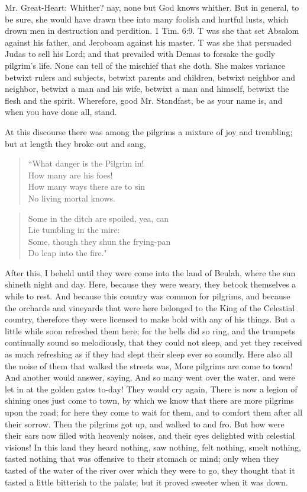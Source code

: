 Mr. Great-Heart: Whither? nay, none but God knows whither. But in general, to be sure, she would have drawn thee into many foolish and hurtful lusts, which drown men in destruction and perdition. 1 Tim. 6:9. T was she that set Absalom against his father, and Jeroboam against his master. T was she that persuaded Judas to sell his Lord; and that prevailed with Demas to forsake the godly pilgrim's life. None can tell of the mischief that she doth. She makes variance betwixt rulers and subjects, betwixt parents and children, betwixt neighbor and neighbor, betwixt a man and his wife, betwixt a man and himself, betwixt the flesh and the spirit. Wherefore, good Mr. Standfast, be as your name is, and when you have done all, stand.

At this discourse there was among the pilgrims a mixture of joy and trembling; but at length they broke out and sang,
\begin{verse}
 ``What danger is the Pilgrim in!\\
How many are his foes!\\
How many ways there are to sin\\
No living mortal knows.\\
\end{verse}
\begin{verse} 
Some in the ditch are spoiled, yea, can\\
Lie tumbling in the mire:\\
Some, though they shun the frying-pan\\
Do leap into the fire."\\
\end{verse}

After this, I beheld until they were come into the land of Beulah, where the sun shineth night and day. Here, because they were weary, they betook themselves a while to rest. And because this country was common for pilgrims, and because the orchards and vineyards that were here belonged to the King of the Celestial country, therefore they were licensed to make bold with any of his things. But a little while soon refreshed them here; for the bells did so ring, and the trumpets continually sound so melodiously, that they could not sleep, and yet they received as much refreshing as if they had slept their sleep ever so soundly. Here also all the noise of them that walked the streets was, More pilgrims are come to town! And another would answer, saying, And so many went over the water, and were let in at the golden gates to-day! They would cry again, There is now a legion of shining ones just come to town, by which we know that there are more pilgrims upon the road; for here they come to wait for them, and to comfort them after all their sorrow. Then the pilgrims got up, and walked to and fro. But how were their ears now filled with heavenly noises, and their eyes delighted with celestial visions! In this land they heard nothing, saw nothing, felt nothing, smelt nothing, tasted nothing that was offensive to their stomach or mind; only when they tasted of the water of the river over which they were to go, they thought that it tasted a little bitterish to the palate; but it proved sweeter when it was down.

